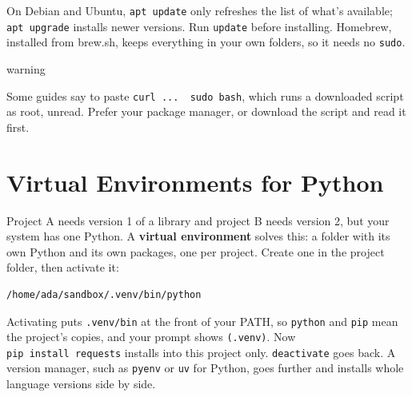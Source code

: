 On Debian and Ubuntu, \texttt{apt\ update} only refreshes the list of what's available; \texttt{apt\ upgrade} installs newer versions. Run \texttt{update} before installing. Homebrew, installed from brew.sh, keeps everything in your own folders, so it needs no \texttt{sudo}.

\begin{callout}{warning}

Some guides say to paste \texttt{curl\ ...\ \textbar{}\ sudo\ bash}, which runs a downloaded script as root, unread. Prefer your package manager, or download the script and read it first.

\end{callout}

\section{Virtual Environments for Python}\label{07-installing-software-and-working-remotely:virtual-environments-for-python}

Project A needs version 1 of a library and project B needs version 2, but your system has one Python. A \textbf{virtual environment} solves this: a folder with its own Python and its own packages, one per project. Create one in the project folder, then activate it:

\begin{codeblock}

\begin{Shaded}
\begin{Highlighting}[]
 
\end{Highlighting}
\end{Shaded}

\end{codeblock}

\begin{codeblock}
\begin{Verbatim}[formatcom=\outputstyle]
/home/ada/sandbox/.venv/bin/python
\end{Verbatim}
\end{codeblock}

Activating puts \texttt{.venv/bin} at the front of your PATH, so \texttt{python} and \texttt{pip} mean the project's copies, and your prompt shows \texttt{(.venv)}. Now \texttt{pip\ install\ requests} installs into this project only. \texttt{deactivate} goes back. A version manager, such as \texttt{pyenv} or \texttt{uv} for Python, goes further and installs whole language versions side by side.

